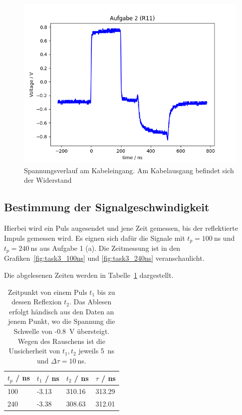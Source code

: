 \documentclass{article}
\begin{document}
\begin{figure}[H]
\centering
\caption{Spannungsverlauf am Kabeleingang. Am Kabelausgang befindet sich der Widerstand }
\label{fig:task2_R11}
\includegraphics[scale=0.6]{bilder/task2/task2_R11.png}
\end{figure}




\subsection{Bestimmung der Signalgeschwindigkeit}

Hierbei wird ein Puls augesendet und jene Zeit gemessen, bis der reflektierte Impuls gemessen wird. Es eignen sich dafür die Signale mit $t_p=100~$ns und $t_p=240~$ns aus Aufgabe 1 (a). Die Zeitmessung ist in den Grafiken~\ref{fig:task3_100ns} und \ref{fig:task3_240ns} veranschaulicht.

Die abgelesenen Zeiten werden in Tabelle~\ref{tab:task3_zeiten} dargestellt.
\begin{table}[H]
\caption{Zeitpunkt von einem Puls $t_1$ bis zu dessen Reflexion $t_2$. Das Ablesen erfolgt händisch aus den Daten an jenem Punkt, wo die Spannung die Schwelle von -0.8~V übersteigt. Wegen des Rauschens ist die Unsicherheit von $t_1,t_2$ jeweils 5~ns und $\Delta \tau = 10~$ns.}
\label{tab:task3_zeiten}
\begin{tabular}{l|lll}
$t_p$ / ns & $t_1$ / ns & $t_2$ / ns & $\tau$ / ns  \\
\hline
100 &  -3.13 & 310.16 & 313.29 \\
240 &  -3.38 & 308.63 & 312.01
\end{tabular}
\end{table}
\end{document}
